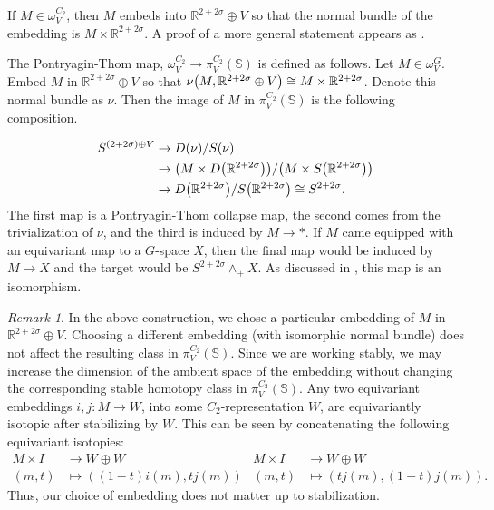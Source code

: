 \documentclass[11pt]{amsart}
\newcommand{\R}{\mathbb R}
\newcommand{\Sph}{\mathbb{S}}
\theoremstyle{plain}   %
\theoremstyle{definition}
\theoremstyle{remark}
\newtheorem{rmk}[thm]{Remark}
\numberwithin{equation}{section}
\let\originalleft\left
\let\originalright\right
\renewcommand{\left}{\mathopen{}\mathclose\bgroup\originalleft}
\renewcommand{\right}{\aftergroup\egroup\originalright}
\begin{document}
If $M\in \omega_V^{C_2}$, then $M$ embeds into $\R^{2+2\sigma}\oplus V$ so that the normal bundle of the embedding is $M\times \R^{2+2\sigma}$. A proof of a more general statement appears as \cite[Lemma 2.44]{williams_cobordism}.

The Pontryagin-Thom map, $\omega_V^{C_2}\to \pi_V^{C_2}(\Sph)$ is defined as follows. Let $M\in \omega_V^G$. Embed $M$ in  $\R^{2+2\sigma}\oplus V$ so that $\nu\left(M,\R^{2+2\sigma}\oplus V\right)\cong M\times \R^{2+2\sigma}$. Denote this normal bundle as $\nu$. Then the image of $M$ in $\pi_V^{C_2}(\Sph)$ is the following composition. 

\begin{align*}
S^{(2+2\sigma)\oplus V}
& \rightarrow D(\nu)/S(\nu)\\
& \rightarrow \left(M\times D\left(\R^{2+2\sigma}\right)\right)/\left(M\times S\left(\R^{2+2\sigma}\right)\right)\\
& \rightarrow D\left(\R^{2+2\sigma}\right)/S\left(\R^{2+2\sigma}\right) \cong S^{2+2\sigma}.
\end{align*} 
The first map is a Pontryagin-Thom collapse map, the second comes from the trivialization of $\nu$, and the third is induced by $M\to *$. If $M$ came equipped with an equivariant map to a $G$-space $X$, then the final map would be induced by $M\to X$ and the target would be $S^{2+2\sigma}\wedge_+ X$. As discussed in \cite{williams_cobordism}, this map is an isomorphism. 

\begin{rmk}
In the above construction, we chose a particular embedding of $M$ in $\R^{2+2\sigma}\oplus V$. Choosing a different embedding (with isomorphic normal bundle) does not affect the resulting class in $\pi_V^{C_2}(\Sph)$. Since we are working stably, we may increase the dimension of the ambient space of the embedding without changing the corresponding stable homotopy class in $\pi_V^{C_2}(\Sph)$. Any two equivariant embeddings $i,j\colon M \to W$, into some $C_2$-representation $W$, are equivariantly isotopic after stabilizing by $W$. This can be seen by concatenating the following equivariant isotopies:
\begin{align*}
M\times I & \rightarrow W\oplus W & M\times I &\rightarrow W\oplus W\\
(m,t)&\mapsto ((1-t)i(m),tj(m)) & (m,t)&\mapsto (tj(m),(1-t)j(m)).
\end{align*}
Thus, our choice of embedding does not matter up to stabilization. 
\end{rmk}
\end{document}
